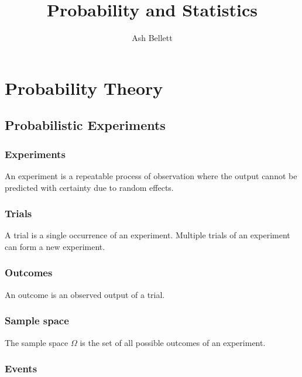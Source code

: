 \documentclass{article}
\title{\textbf{Probability and Statistics}}
\author{Ash Bellett}
\date{}
\begin{document}
\clearpage
\maketitle
\thispagestyle{empty}
\setcounter{page}{0}
\newpage
\tableofcontents
\setcounter{page}{0}
\newpage

\section{Probability Theory}

\subsection{Probabilistic Experiments}

\subsubsection{Experiments}

An experiment is a repeatable process of observation where the output cannot be predicted with certainty due to random effects.

\subsubsection{Trials}

A trial is a single occurrence of an experiment. Multiple trials of an experiment can form a new experiment.

\subsubsection{Outcomes}

An outcome is an observed output of a trial.

\subsubsection{Sample space}

The sample space $\Omega$ is the set of all possible outcomes of an experiment.

\subsubsection{Events}
\end{document}
